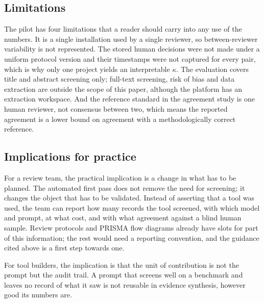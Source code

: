 \subsection{Limitations}

The pilot has four limitations that a reader should carry into any use of the
numbers. It is a single installation used by a single reviewer, so
between-reviewer variability is not represented. The stored human decisions
were not made under a uniform protocol version and their timestamps were not
captured for every pair, which is why only one project yields an interpretable
$\kappa$. The evaluation covers title and abstract screening only; full-text
screening, risk of bias and data extraction are outside the scope of this
paper, although the platform has an extraction workspace. And the reference
standard in the agreement study is one human reviewer, not consensus between
two, which means the reported agreement is a lower bound on agreement with a
methodologically correct reference.

\subsection{Implications for practice}

For a review team, the practical implication is a change in what has to be
planned. The automated first pass does not remove the need for screening; it
changes the object that has to be validated. Instead of asserting that a tool
was used, the team can report how many records the tool screened, with which
model and prompt, at what cost, and with what agreement against a blind human
sample. Review protocols and PRISMA flow diagrams already have slots for part
of this information; the rest would need a reporting convention, and the
guidance cited above is a first step towards one.

For tool builders, the implication is that the unit of contribution is not the
prompt but the audit trail. A prompt that screens well on a benchmark and
leaves no record of what it saw is not reusable in evidence synthesis, however
good its numbers are.
